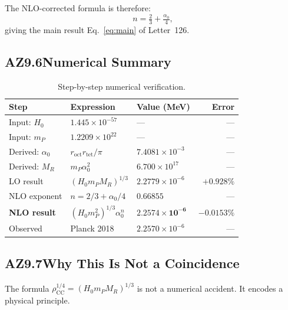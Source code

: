 \documentclass[aps,prl,twocolumn,showpacs,preprintnumbers]{revtex4-2}
\newcommand{\roct}{r_{\mathrm{oct}}}
\newcommand{\rtet}{r_{\mathrm{tet}}}
\newcommand{\azero}{\alpha_0}
\newcommand{\mP}{m_P}
\newcommand{\MR}{M_R}
\newcommand{\rhoCC}{\rho_{\mathrm{CC}}}
\newcommand{\Hzero}{H_0}
\begin{document}
The NLO-corrected formula is therefore:
\begin{equation}
  n = \tfrac{2}{3} + \tfrac{\azero}{4},
\end{equation}
giving the main result Eq.~\eqref{eq:main} of Letter~126.

\subsection*{AZ9.6\quad Numerical Summary}

\begin{table}[h]
\centering
\caption{Step-by-step numerical verification.}
\label{tab:steps}
\begin{tabular}{lllr}
\toprule
Step & Expression & Value (MeV) & Error \\
\midrule
Input: $\Hzero$ & $1.445\times10^{-57}$ & --- & --- \\
Input: $\mP$    & $1.2209\times10^{22}$ & --- & --- \\
Derived: $\azero$ & $\roct\rtet/\pi$ & $7.4081\times10^{-3}$ & --- \\
Derived: $\MR$  & $\mP\azero^2$ & $6.700\times10^{17}$ & --- \\
LO result & $(\Hzero\mP\MR)^{1/3}$ & $2.2779\times10^{-6}$ & $+0.928\%$ \\
NLO exponent & $n = 2/3 + \azero/4$ & $0.66855$ & --- \\
\textbf{NLO result} & $(\Hzero\mP^2)^{1/3}\azero^n$ & $\mathbf{2.2574\times10^{-6}}$ & $\mathbf{-0.0153\%}$ \\
\midrule
Observed & Planck 2018 & $2.2570\times10^{-6}$ & --- \\
\bottomrule
\end{tabular}
\end{table}

\subsection*{AZ9.7\quad Why This Is Not a Coincidence}

The formula $\rhoCC^{1/4} = (\Hzero\mP\MR)^{1/3}$ is not a numerical
accident. It encodes a physical principle.
\end{document}
